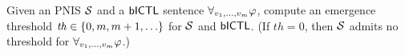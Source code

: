 \begin{definition}
  Given an PNIS $\mathcal{S}$ and a $\sf{bICTL}$ sentence $\forall_{v_1,\ldots,v_m} \varphi$, compute an
  emergence threshold $\mathit{th} \in \left \{ 0, m, m+1, \ldots \right \}$ for $\mathcal{S}$ and
  $\sf{bICTL}$.  (If $\mathit{th}=0$, then $\mathcal{S}$ admits no threshold for
  $\forall_{v_1,\ldots,v_m} \varphi$.)
\end{definition}
  







